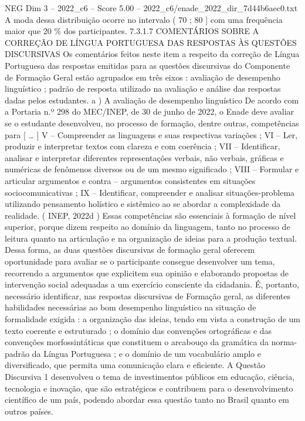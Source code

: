\begin{textsample}{NEG Dim 3 – 2022\_c6 – Score 5.00 – 2022\_c6/enade\_2022\_dir\_7d44b6aec0.txt}
A moda dessa distribuição ocorre no intervalo ( 70 ; 80 ] com uma frequência maior que 20 \% dos participantes. 7.3.1.7 COMENTÁRIOS SOBRE A CORREÇÃO DE LÍNGUA PORTUGUESA DAS RESPOSTAS ÀS QUESTÕES DISCURSIVAS Os comentários feitos neste item a respeito da correção de Língua Portuguesa das respostas emitidas para as questões discursivas do Componente de Formação Geral estão agrupados em três eixos : avaliação de desempenho linguístico ; padrão de resposta utilizado na avaliação e análise das respostas dadas pelos estudantes. a ) A avaliação de desempenho linguístico De acordo com a Portaria n.º 298 do MEC/INEP, de 30 de junho de 2022, o Enade deve avaliar se o estudante desenvolveu, no processo de formação, dentre outras, competências para [ … ] V – Compreender as linguagens e suas respectivas variações ; VI – Ler, produzir e interpretar textos com clareza e com coerência ; VII – Identificar, analisar e interpretar diferentes representações verbais, não verbais, gráficas e numéricas de fenômenos diversos ou de um mesmo significado ; VIII – Formular e articular argumentos e contra – argumentos consistentes em situações sociocomunicativas ; IX – Identificar, compreender e analisar situações-problema utilizando pensamento holístico e sistêmico ao se abordar a complexidade da realidade. ( INEP, 2022d ) Essas competências são essenciais à formação de nível superior, porque dizem respeito ao domínio da linguagem, tanto no processo de leitura quanto na articulação e na organização de ideias para a produção textual.
Dessa forma, as duas questões discursivas de formação geral oferecem oportunidade para avaliar se o participante consegue desenvolver um tema, recorrendo a argumentos que explicitem sua opinião e elaborando propostas de intervenção social adequadas a um exercício consciente da cidadania.
É, portanto, necessário identificar, nas respostas discursivas de Formação geral, as diferentes habilidades necessárias ao bom desempenho linguístico na situação de formalidade exigida : a organização das ideias, tendo em vista a construção de um texto coerente e estruturado ; o domínio das convenções ortográficas e das convenções morfossintáticas que constituem o arcabouço da gramática da norma-padrão da Língua Portuguesa ; e o domínio de um vocabulário amplo e diversificado, que permita uma comunicação clara e eficiente.
A Questão Discursiva 1 desenvolveu o tema de investimentos públicos em educação, ciência, tecnologia e inovação, que são estratégicos e contribuem para o desenvolvimento científico de um país, podendo abordar essa questão tanto no Brasil quanto em outros países.

\end{textsample}
